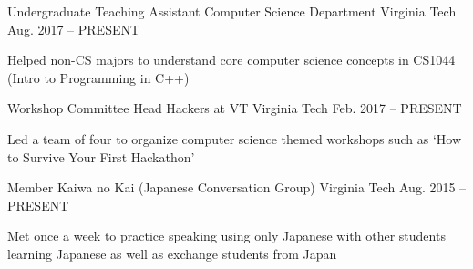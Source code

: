 

\begin{cventries}

  \cventry
    {Undergraduate Teaching Assistant} %
    {Computer Science Department} %
    {Virginia Tech} %
    {Aug. 2017 – PRESENT} %
    {
      \begin{cvitems} %
        \item {Helped non-CS majors to understand core computer science concepts in CS1044 (Intro to Programming in C++)}
      \end{cvitems}
    }

  \cventry
    {Workshop Committee Head} %
    {Hackers at VT} %
    {Virginia Tech} %
    {Feb. 2017 – PRESENT} %
    {
      \begin{cvitems} %
        \item {Led a team of four to organize computer science themed workshops such as `How to Survive Your First Hackathon'}
      \end{cvitems}
    }

  \cventry
    {Member} %
    {Kaiwa no Kai (Japanese Conversation Group)} %
    {Virginia Tech} %
    {Aug. 2015 – PRESENT} %
    {
      \begin{cvitems} %
        \item {Met once a week to practice speaking using only Japanese with other students learning Japanese as well as exchange students from Japan}
      \end{cvitems}
    }

\end{cventries}
